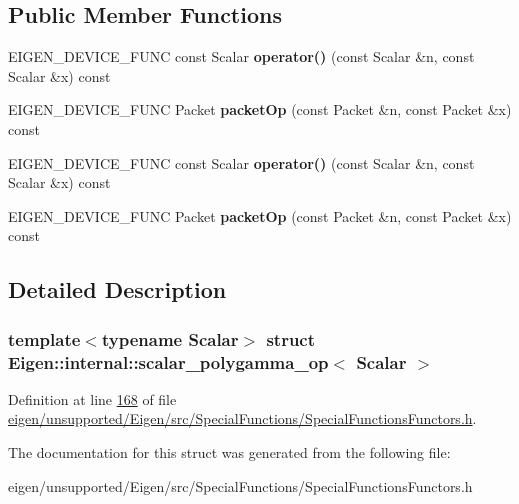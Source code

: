 \subsection*{Public Member Functions}
\begin{DoxyCompactItemize}
\item 
\mbox{\label{struct_eigen_1_1internal_1_1scalar__polygamma__op_ac9edf79d7f00ba466ec75c85ff4d520d}} 
E\+I\+G\+E\+N\+\_\+\+D\+E\+V\+I\+C\+E\+\_\+\+F\+U\+NC const Scalar {\bfseries operator()} (const Scalar \&n, const Scalar \&x) const
\item 
\mbox{\label{struct_eigen_1_1internal_1_1scalar__polygamma__op_a917dc649797edbfb6a14c4e046e28534}} 
E\+I\+G\+E\+N\+\_\+\+D\+E\+V\+I\+C\+E\+\_\+\+F\+U\+NC Packet {\bfseries packet\+Op} (const Packet \&n, const Packet \&x) const
\item 
\mbox{\label{struct_eigen_1_1internal_1_1scalar__polygamma__op_ac9edf79d7f00ba466ec75c85ff4d520d}} 
E\+I\+G\+E\+N\+\_\+\+D\+E\+V\+I\+C\+E\+\_\+\+F\+U\+NC const Scalar {\bfseries operator()} (const Scalar \&n, const Scalar \&x) const
\item 
\mbox{\label{struct_eigen_1_1internal_1_1scalar__polygamma__op_a917dc649797edbfb6a14c4e046e28534}} 
E\+I\+G\+E\+N\+\_\+\+D\+E\+V\+I\+C\+E\+\_\+\+F\+U\+NC Packet {\bfseries packet\+Op} (const Packet \&n, const Packet \&x) const
\end{DoxyCompactItemize}


\subsection{Detailed Description}
\subsubsection*{template$<$typename Scalar$>$\newline
struct Eigen\+::internal\+::scalar\+\_\+polygamma\+\_\+op$<$ Scalar $>$}



Definition at line \hyperlink{eigen_2unsupported_2_eigen_2src_2_special_functions_2_special_functions_functors_8h_source_l00168}{168} of file \hyperlink{eigen_2unsupported_2_eigen_2src_2_special_functions_2_special_functions_functors_8h_source}{eigen/unsupported/\+Eigen/src/\+Special\+Functions/\+Special\+Functions\+Functors.\+h}.



The documentation for this struct was generated from the following file\+:\begin{DoxyCompactItemize}
\item 
eigen/unsupported/\+Eigen/src/\+Special\+Functions/\+Special\+Functions\+Functors.\+h\end{DoxyCompactItemize}
